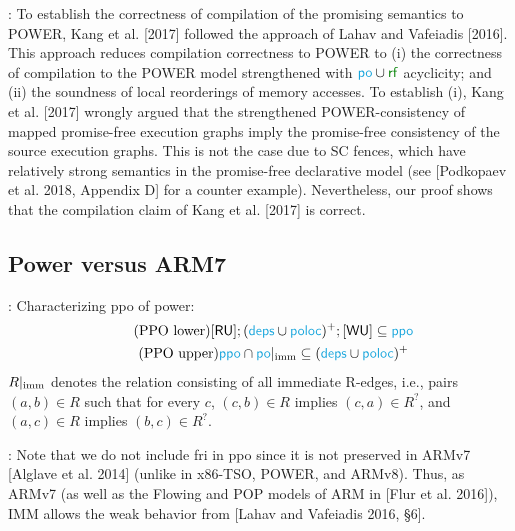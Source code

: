 \cite[\textsection{}8]{DBLP:journals/pacmpl/PodkopaevLV19}:
To establish the correctness of compilation of the promising semantics to
POWER, Kang et al. [2017] followed the approach of Lahav and Vafeiadis
[2016]. This approach reduces compilation correctness to POWER to (i) the
correctness of compilation to the POWER model strengthened with ${\rpox}\cup {\rrf}$
acyclicity; and (ii) the soundness of local reorderings of memory
accesses. To establish (i), Kang et al. [2017] wrongly argued that the
strengthened POWER-consistency of mapped promise-free execution graphs imply
the promise-free consistency of the source execution graphs. This is not the
case due to SC fences, which have relatively strong semantics in the
promise-free declarative model (see [Podkopaev et al. 2018, Appendix D] for a
counter example). Nevertheless, our proof shows that the compilation claim of
Kang et al. [2017] is correct.



\subsection{Power versus ARM7}
\label{sec:ppc:arm7}
\cite[]{DBLP:conf/fm/LahavV16}: Characterizing ppo of power:
\begin{gather*}
  \tag{PPO lower}
  \mathsf{[RU]};({\rdeps}\cup{\rpoloc})^+;\mathsf{[WU]} \subseteq {\rppo}
  \\
  \tag{PPO upper}
  {\rppo}\cap{{\rpox}\imm} \subseteq ({\rdeps}\cup{\rpoloc})^+
\end{gather*}
$R\mathbin{|}_{\mathrm{imm}}$ denotes the relation consisting of all immediate R-edges,
i.e., pairs $(a,b) \in R$ such that for every $c$, $(c,b) \in R$ implies $(c,a) \in R^?$, and 
$(a, c) \in R$ implies $(b, c) \in R^?$.

\cite[After example 3.6]{DBLP:journals/pacmpl/PodkopaevLV19}:
Note that we do not include fri in ppo since it is not preserved in ARMv7
[Alglave et al. 2014] (unlike in x86-TSO, POWER, and ARMv8). Thus, as ARMv7
(as well as the Flowing and POP models of ARM in [Flur et al. 2016]), IMM
allows the weak behavior from [Lahav and Vafeiadis 2016, §6].

